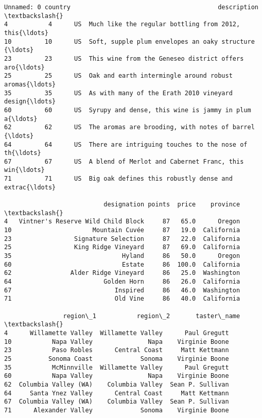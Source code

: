 \documentclass[11pt]{article}
\begin{document}
    \begin{Verbatim}[commandchars=\\\{\}]
   Unnamed: 0 country                                        description  \textbackslash{}
4           4      US  Much like the regular bottling from 2012, this{\ldots}
10         10      US  Soft, supple plum envelopes an oaky structure {\ldots}
23         23      US  This wine from the Geneseo district offers aro{\ldots}
25         25      US  Oak and earth intermingle around robust aromas{\ldots}
35         35      US  As with many of the Erath 2010 vineyard design{\ldots}
60         60      US  Syrupy and dense, this wine is jammy in plum a{\ldots}
62         62      US  The aromas are brooding, with notes of barrel {\ldots}
64         64      US  There are intriguing touches to the nose of th{\ldots}
67         67      US  A blend of Merlot and Cabernet Franc, this win{\ldots}
71         71      US  Big oak defines this robustly dense and extrac{\ldots}

                           designation points  price    province  \textbackslash{}
4   Vintner's Reserve Wild Child Block     87   65.0      Oregon
10                      Mountain Cuvée     87   19.0  California
23                 Signature Selection     87   22.0  California
25                 King Ridge Vineyard     87   69.0  California
35                              Hyland     86   50.0      Oregon
60                              Estate     86  100.0  California
62                Alder Ridge Vineyard     86   25.0  Washington
64                         Golden Horn     86   26.0  California
67                            Inspired     86   46.0  Washington
71                            Old Vine     86   40.0  California

                region\_1           region\_2       taster\_name  \textbackslash{}
4      Willamette Valley  Willamette Valley      Paul Gregutt
10           Napa Valley               Napa    Virginie Boone
23           Paso Robles      Central Coast     Matt Kettmann
25          Sonoma Coast             Sonoma    Virginie Boone
35           McMinnville  Willamette Valley      Paul Gregutt
60           Napa Valley               Napa    Virginie Boone
62  Columbia Valley (WA)    Columbia Valley  Sean P. Sullivan
64     Santa Ynez Valley      Central Coast     Matt Kettmann
67  Columbia Valley (WA)    Columbia Valley  Sean P. Sullivan
71      Alexander Valley             Sonoma    Virginie Boone


\end{Verbatim}
\end{document}
